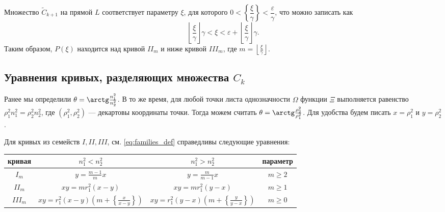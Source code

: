 Множество $\widetilde{C}_{k+1}$ на прямой $L$ соответствует параметру $\xi$, для которого $0 <  \left\{ \dfrac{\xi }{\gamma}\right\} < \dfrac{\varepsilon}{\gamma}$, что можно записать как 
$$\left\lfloor \frac{\xi}{\gamma} \right\rfloor \gamma < \xi < \varepsilon + \left\lfloor \frac{\xi}{\gamma} \right\rfloor  \gamma.$$
Таким образом, $P(\xi)$ находится над кривой $II_m$ и ниже  кривой $III_m$, где $m=\left\lfloor \frac{\xi}{\gamma} \right\rfloor$.


\subsection{Уравнения кривых, разделяющих множества $C_k$}\label{sec:ch4/sec3/subsec4}
Ранее мы определили $\theta = \arctg \frac{n_1^2}{n_2^2}$. В то же время, для любой точки  листа однозначности $\Omega$ функции $\Xi$ выполняется равенство $\rho_1^2 n_1^2 = \rho_2^2 n_2^2$, где $(\rho_1^2, \rho_2^2)$ --- декартовы координаты точки.
Тогда можем считать $\theta = \arctg \frac{\rho_2^2}{\rho_1^2}$. Для удобства будем писать $x = \rho_1^2$ и $y=\rho_2^2$. 

\begin{statement}
Для кривых из семейств $I, II, III$, см. \eqref{eq:families_def} справедливы следующие уравнения:
\begin{center}
\begin{tabular}{|c|c|c|c|}
\hline 
кривая &  $n_1^2 < n_2^2$  	& 	$n_1^2 > n_2^2$				& 	параметр\\ \hline 
\hline 
$I_m$ & 	$y = \frac{m-1}{m} x$  	& 	$y = \frac{m}{m-1}x $ 				&	$m \geq 2$ \\ \hline 
$II_m$ & 	$x y = m r_1^2 (x-y)$  	& 	$xy = m r_1^2(y-x) $ 		&	$m \geq 1$ \\ \hline 
$III_m$ & 	$x y = r_1^2 (x-y) \left( m + \left\{\frac{x}{x-y}\right\}\right)$  	& 	$x y = r_1^2 (y-x) \left( m + \left\{\frac{y}{y-x}\right\}\right) $ 												&	$m \geq 0$ \\ \hline 
\end{tabular}
\end{center}
\label{st:curves_formulas}
\end{statement}

